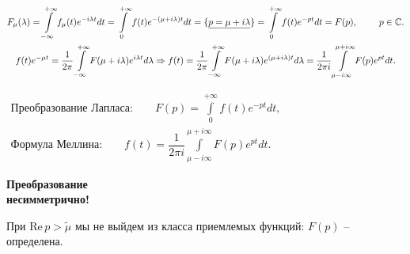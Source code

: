 	$$
	\begin{gathered}
		\large F_{\mu}(\lambda) 	= \int\limits_{-\infty}^{+\infty}f_{\mu}(t)e^{-i\lambda t} dt 
											 	= \int\limits_{0}^{+\infty}f(t)e^{-(\mu+i\lambda) t} dt =
											 	\{ \underline{p = \mu +i\lambda}\} =
											 	 \int\limits_{0}^{+\infty}f(t)e^{-p t} dt = 
											 	 F(p), \qquad p \in \mathbb{C}. \\							 	
	 	f(t)e^{-\mu t} = \dfrac{1}{2\pi} \int\limits_{-\infty}^{+\infty} F(\mu+i\lambda)e^{i\lambda t} d \lambda
	 		 \Rightarrow 
	 		 	f(t) =  \dfrac{1}{2\pi} \int\limits_{-\infty}^{+\infty} F(\mu+i\lambda)e^{(\mu +i\lambda) t} d \lambda
	 		 		=   \dfrac{1}{2\pi i} \int\limits_{\mu-i\infty}^{\mu+i\infty} F(p)e^{pt} d t. \\
	 \end{gathered}
	$$
	
	\begin{minipage}{0.4\textwidth}
		$
			\begin{gathered}
			 	\textbf{Преобразование Лапласа:} \qquad
			 		F(p) = \int\limits_{0}^{+\infty} f(t) e^{-pt}dt,  \\
				\textbf{Формула Меллина:} \qquad	
					f(t) =  \dfrac{1}{2\pi i} \int\limits_{\mu-i\infty}^{\mu+i\infty} F(p)e^{pt} d t. 
			\end{gathered} 
		$
	\end{minipage}
	\hfill
	\begin{minipage}{0.3\textwidth}
		\textbf{Преобразование \\ несимметрично!} \vspace{3mm}
	\end{minipage} \newline
	\noindent
	При $\textrm{Re}\, p >\widetilde{\mu}$ мы не выйдем из класса приемлемых функций: $F(p)$ -- определена.
	
